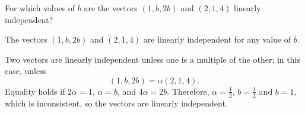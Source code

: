 \documentclass{ximera}
\begin{document}
\begin{exercise} \label{c5.4.4}
For which values of $b$ are the vectors $(1,b,2b)$ and $(2,1,4)$
linearly independent?

\begin{solution}

\ans The vectors $(1,b,2b)$ and $(2,1,4)$ are linearly independent
for any value of $b$.

\soln Two vectors are linearly independent unless one is a multiple
of the other; in this case, unless
\[
(1,b,2b) = \alpha(2,1,4).
\]
Equality holds if $2\alpha = 1$, $\alpha = b$, and $4\alpha = 2b$.
Therefore, $\alpha = \frac{1}{2}$, $b = \frac{1}{2}$ and $b = 1$,
which is inconsistent, so the vectors are linearly independent.

\end{solution}
\end{exercise}
\end{document}
